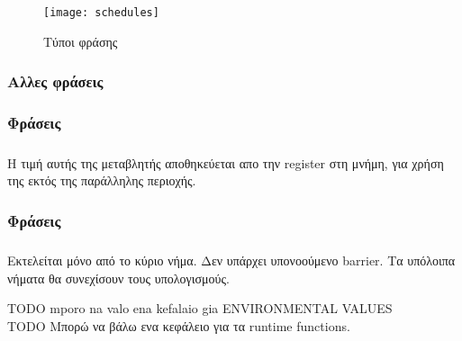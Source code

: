        
       \begin{figure}[h]
\texttt{[image: schedules]}
\centering
\captionsetup{justification=centering, singlelinecheck=false}
	\caption{Τύποι φράσης }
\label{fig:schedules}
\end{figure}


\subsubsection{Αλλες φράσεις}
\subparagraph{}
\subsubsection{Φράσεις }
\subparagraph{}
Η τιμή αυτής της μεταβλητής αποθηκεύεται απο την register στη μνήμη, για χρήση της εκτός της παράλληλης περιοχής.
\subsubsection{Φράσεις }
\subparagraph{}
      Εκτελείται μόνο από το κύριο νήμα. Δεν υπάρχει υπονοούμενο barrier. Τα υπόλοιπα νήματα θα συνεχίσουν τους υπολογισμούς.

{\Large TODO mporo na valo ena kefalaio gia ENVIRONMENTAL VALUES \\
TODO  Μπορώ να βάλω ενα κεφάλειο για τα runtime functions.}
